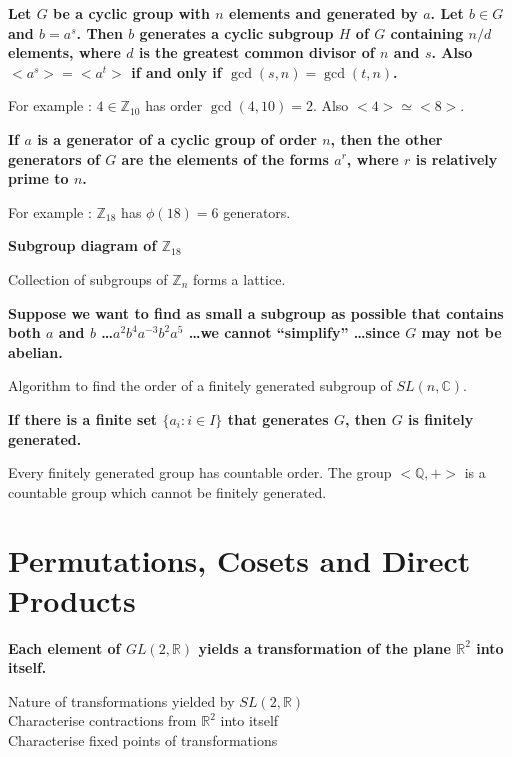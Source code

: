 \documentclass[a4paper,12pt,openany]{book}
\newcommand{\iso}{\simeq} %
\begin{document}
\textbf{\phantom{}}
\textbf{Let $G$ be a cyclic group with $n$ elements and generated by $a$. Let $b \in G$ and $b = a^s$. Then $b$ generates a cyclic subgroup $H$ of $G$ containing $n/d$ elements, where $d$ is the greatest common divisor of $n$ and $s$. Also $<\!a^s\!> = <\!a^t\!>$ if and only if $\gcd(s,n) = \gcd(t,n)$.}
\begin{challenge}
	For example : $4 \in \mathbb{Z}_{10}$ has order $\gcd(4,10) = 2$.
	Also $<\!4\!> \iso <\!8\!>$.
\end{challenge}

\textbf{\phantom{}}
\textbf{If $a$ is a generator of a cyclic group of order $n$, then the other generators of $G$ are the elements of the forms $a^r$, where $r$ is relatively prime to $n$.}\\
\begin{challenge}
	For example : $\mathbb{Z}_{18}$ has $\phi(18) = 6$ generators.
\end{challenge}

\textbf{\phantom{}}
\textbf{Subgroup diagram of $\mathbb{Z}_{18}$}\\
\begin{challenge}
	Collection of subgroups of $\mathbb{Z}_n$ forms a lattice.
\end{challenge}

\textbf{\phantom{}}
\textbf{Suppose we want to find as small a subgroup as possible that contains both $a$ and $b$ \dots $a^2b^4a^{-3}b^2a^5$ \dots we cannot ``simplify'' \dots since $G$ may not be abelian.}\\
\begin{doubt}
	Algorithm to find the order of a finitely generated subgroup of $SL(n,\mathbb{C})$.
\end{doubt}

\textbf{\phantom{}}
\textbf{If there is a finite set $\{a_i : i \in I\}$ that generates $G$, then $G$ is finitely generated.}\\
\begin{challenge}
	Every finitely generated group has countable order.
	The group $<\!\mathbb{Q},+\!>$ is a countable group which cannot be finitely generated.
\end{challenge}

\chapter{Permutations, Cosets and Direct Products}
\textbf{\phantom{}}
\textbf{Each element of $GL(2,\mathbb{R})$ yields a transformation of the plane $\mathbb{R}^2$ into itself.}\\
\begin{doubt}
	Nature of transformations yielded by $SL(2,\mathbb{R})$\\
	Characterise contractions from $\mathbb{R}^2$ into itself\\
	Characterise fixed points of transformations
\end{doubt}
\end{document}
